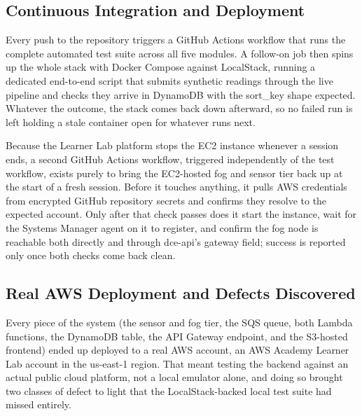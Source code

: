 \documentclass[conference]{IEEEtran}
\begin{document}
\subsection{Continuous Integration and Deployment}
Every push to the repository triggers a GitHub Actions workflow that runs the complete automated test suite across all five modules. A follow-on job then spins up the whole stack with Docker Compose against LocalStack, running a dedicated end-to-end script that submits synthetic readings through the live pipeline and checks they arrive in DynamoDB with the sort\_key shape expected. Whatever the outcome, the stack comes back down afterward, so no failed run is left holding a stale container open for whatever runs next.

Because the Learner Lab platform stops the EC2 instance whenever a session ends, a second GitHub Actions workflow, triggered independently of the test workflow, exists purely to bring the EC2-hosted fog and sensor tier back up at the start of a fresh session. Before it touches anything, it pulls AWS credentials from encrypted GitHub repository secrets and confirms they resolve to the expected account. Only after that check passes does it start the instance, wait for the Systems Manager agent on it to register, and confirm the fog node is reachable both directly and through dce-api's gateway field; success is reported only once both checks come back clean.

\subsection{Real AWS Deployment and Defects Discovered}
Every piece of the system (the sensor and fog tier, the SQS queue, both Lambda functions, the DynamoDB table, the API Gateway endpoint, and the S3-hosted frontend) ended up deployed to a real AWS account, an AWS Academy Learner Lab account in the us-east-1 region. That meant testing the backend against an actual public cloud platform, not a local emulator alone, and doing so brought two classes of defect to light that the LocalStack-backed local test suite had missed entirely.
\end{document}
